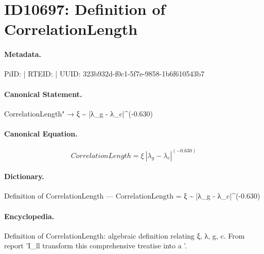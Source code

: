 \section*{ID10697: Definition of CorrelationLength}
\paragraph{Metadata.}
PiID:  | RTEID:  | UUID: 323b932d-f0c1-5f7e-9858-1b6f610543b7

\paragraph{Canonical Statement.}
CorrelationLength" → ξ \textasciitilde{} |λ\_g - λ\_c|\textasciicircum{}(-0.630)

\paragraph{Canonical Equation.}
\[
CorrelationLength = ξ ~ |λ_g - λ_c|^(-0.630)
\]

\paragraph{Dictionary.}
Definition of CorrelationLength — CorrelationLength = ξ \textasciitilde{} |λ\_g - λ\_c|\textasciicircum{}(-0.630)

\paragraph{Encyclopedia.}
Definition of CorrelationLength: algebraic definition relating ξ, λ, g, c. From report 'I\_ll transform this comprehensive treatise into a '.
